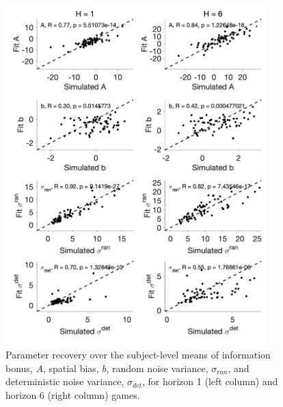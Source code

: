 \documentclass[12pt]{article}
\begin{document}
	
	\begin{figure}[H]
		\begin{center}
			\includegraphics[width=0.9\textwidth]{figures/RanDetNoise_parameter_recovery1.png}
			\caption{Parameter recovery over the subject-level means of information bonus, $A$, spatial bias, $b$, random noise variance, $\sigma_{ran}$, and deterministic noise variance, $\sigma_{det}$, for horizon 1 (left column) and horizon 6 (right column) games. 
			}
			\label{fig:pararecover1}
		\end{center}
	\end{figure} 
	
	
	
	
	\cleardoublepage
	\ifdefined{}
	\else
	\fi
	
\end{document}
